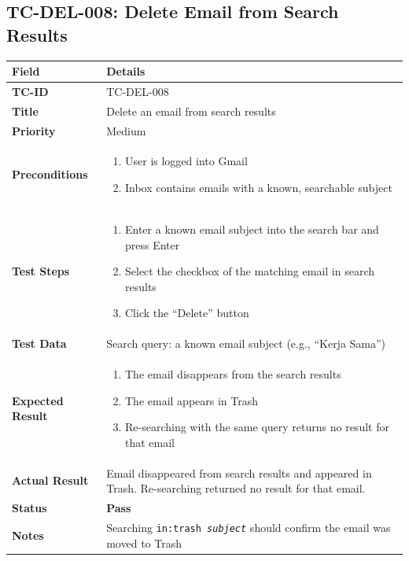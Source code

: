 \documentclass[12pt,a4paper]{article}
\begin{document}
\subsection{TC-DEL-008: Delete Email from Search Results}

\begin{longtable}{|L{3.5cm}|L{11.5cm}|}
\hline
{}\textbf{Field} & \textbf{Details} \\
\hline
\textbf{TC-ID}           & TC-DEL-008 \\
\hline
\textbf{Title}           & Delete an email from search results \\
\hline
\textbf{Priority}        & Medium \\
\hline
\textbf{Preconditions}   & \begin{enumerate}[noitemsep,topsep=0pt]
                              \item User is logged into Gmail
                              \item Inbox contains emails with a known, searchable subject
                            \end{enumerate} \\
\hline
\textbf{Test Steps}      & \begin{enumerate}[noitemsep,topsep=0pt]
                              \item Enter a known email subject into the search bar and press Enter
                              \item Select the checkbox of the matching email in search results
                              \item Click the ``Delete'' button
                            \end{enumerate} \\
\hline
\textbf{Test Data}       & Search query: a known email subject (e.g., ``Kerja Sama'') \\
\hline
\textbf{Expected Result} & \begin{enumerate}[noitemsep,topsep=0pt]
                              \item The email disappears from the search results
                              \item The email appears in Trash
                              \item Re-searching with the same query returns no result for that email
                            \end{enumerate} \\
\hline
\textbf{Actual Result}   & Email disappeared from search results and appeared in Trash. Re-searching returned no result for that email. \\
\hline
\textbf{Status}          & \textcolor{passgreen}{\textbf{Pass}} \\
\hline
\textbf{Notes}           & Searching \texttt{in:trash \textit{subject}} should confirm the email was moved to Trash \\
\hline
\end{longtable}
\end{document}

